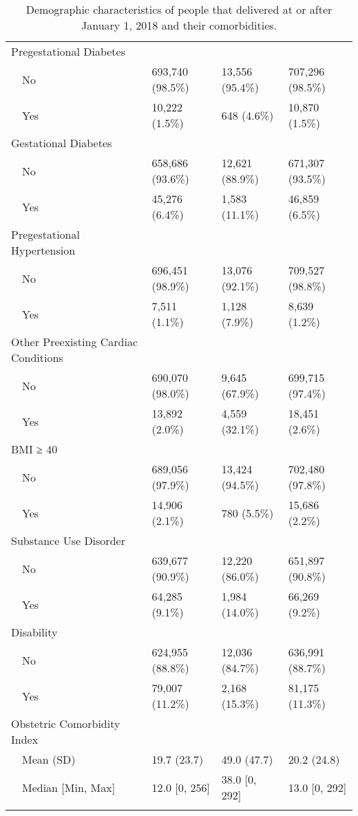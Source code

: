 \begin{longtable}{llll}
  Pregestational Diabetes &  &  &  \\ 
    No & 693,740 (98.5\%) & 13,556 (95.4\%) & 707,296 (98.5\%) \\ 
    Yes & 10,222 (1.5\%) & 648 (4.6\%) & 10,870 (1.5\%) \\ 
  Gestational Diabetes &  &  &  \\ 
    No & 658,686 (93.6\%) & 12,621 (88.9\%) & 671,307 (93.5\%) \\ 
    Yes & 45,276 (6.4\%) & 1,583 (11.1\%) & 46,859 (6.5\%) \\ 
  Pregestational Hypertension &  &  &  \\ 
    No & 696,451 (98.9\%) & 13,076 (92.1\%) & 709,527 (98.8\%) \\ 
    Yes & 7,511 (1.1\%) & 1,128 (7.9\%) & 8,639 (1.2\%) \\ 
  Other Preexisting Cardiac Conditions &  &  &  \\ 
    No & 690,070 (98.0\%) & 9,645 (67.9\%) & 699,715 (97.4\%) \\ 
    Yes & 13,892 (2.0\%) & 4,559 (32.1\%) & 18,451 (2.6\%) \\ 
  BMI ≥ 40 &  &  &  \\ 
    No & 689,056 (97.9\%) & 13,424 (94.5\%) & 702,480 (97.8\%) \\ 
    Yes & 14,906 (2.1\%) & 780 (5.5\%) & 15,686 (2.2\%) \\ 
  Substance Use Disorder &  &  &  \\ 
    No & 639,677 (90.9\%) & 12,220 (86.0\%) & 651,897 (90.8\%) \\ 
    Yes & 64,285 (9.1\%) & 1,984 (14.0\%) & 66,269 (9.2\%) \\ 
  Disability &  &  &  \\ 
    No & 624,955 (88.8\%) & 12,036 (84.7\%) & 636,991 (88.7\%) \\ 
    Yes & 79,007 (11.2\%) & 2,168 (15.3\%) & 81,175 (11.3\%) \\ 
  Obstetric Comorbidity Index &  &  &  \\ 
    Mean (SD) & 19.7 (23.7) & 49.0 (47.7) & 20.2 (24.8) \\ 
    Median [Min, Max] & 12.0 [0, 256] & 38.0 [0, 292] & 13.0 [0, 292] \\ 
  \hline
\caption{Demographic characteristics of people that delivered at or after January 1, 2018 and their comorbidities. } 
\label{tab:table_1}
\end{longtable}
